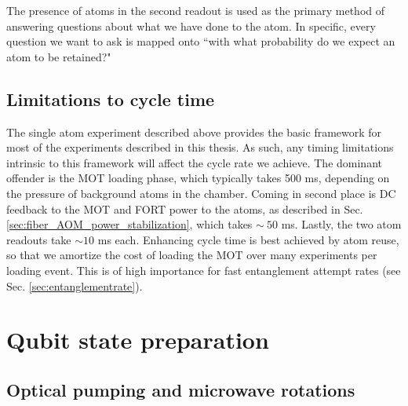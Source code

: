 The presence of atoms in the second readout is used as the primary method of answering questions about what we have done to the atom. In specific, every question we want to ask is mapped onto ``with what probability do we expect an atom to be retained?"

\subsection{Limitations to cycle time}
The single atom experiment described above provides the basic framework for most of the experiments described in this thesis. As such, any timing limitations intrinsic to this framework will affect the cycle rate we achieve. The dominant offender is the MOT loading phase, which typically takes 500 ms, depending on the pressure of background atoms in the chamber. Coming in second place is DC feedback to the MOT and FORT power to the atoms, as described in Sec. \ref{sec:fiber_AOM_power_stabilization}, which takes $\sim~50$ ms. Lastly, the two atom readouts take $\sim10$ ms each. Enhancing cycle time is best achieved by atom reuse, so that we amortize the cost of loading the MOT over many experiments per loading event. This is of high importance for fast entanglement attempt rates (see Sec. \ref{sec:entanglementrate}).

\section{Qubit state preparation}

\subsection{Optical pumping and microwave rotations}


